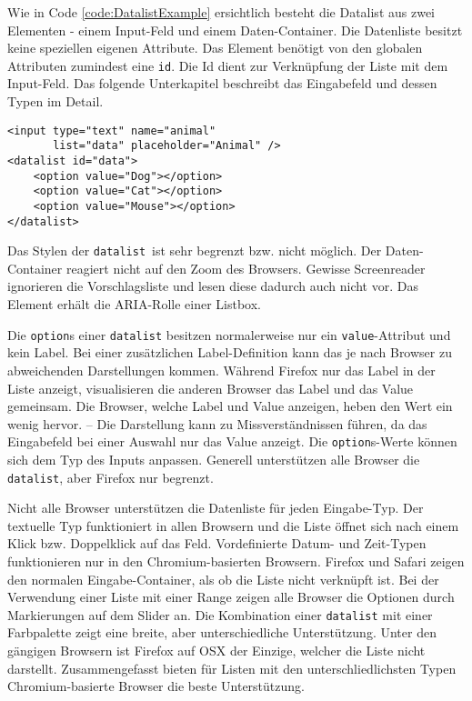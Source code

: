 Wie in Code \ref{code:DatalistExample} ersichtlich besteht die Datalist aus zwei Elementen - einem Input-Feld und einem Daten-Container. 
Die Datenliste besitzt keine speziellen eigenen Attribute.
Das Element benötigt von den globalen Attributen zumindest eine \texttt{id}.
Die Id dient zur Verknüpfung der Liste mit dem Input-Feld. 
Das folgende Unterkapitel \textbf{} beschreibt das Eingabefeld und dessen Typen im Detail.

\begin{lstlisting}[style = htmlcssjs, caption = Datalist Example, label = code:DatalistExample]
<input type="text" name="animal" 
       list="data" placeholder="Animal" />
<datalist id="data">
    <option value="Dog"></option>
    <option value="Cat"></option>
    <option value="Mouse"></option>
</datalist>
\end{lstlisting}

Das Stylen der \texttt{datalist}\footnotemark \ ist sehr begrenzt bzw. nicht möglich. 
Der Daten-Container reagiert nicht auf den Zoom des Browsers.
Gewisse Screenreader ignorieren die Vorschlagsliste und lesen diese dadurch auch nicht vor.
Das Element erhält die ARIA-Rolle einer Listbox.

Die \texttt{option}s einer \texttt{datalist} besitzen normalerweise nur ein \texttt{value}-Attribut und kein Label.
Bei einer zusätzlichen Label-Definition kann das je nach Browser zu abweichenden Darstellungen kommen. 
Während Firefox nur das Label in der Liste anzeigt, visualisieren die anderen Browser das Label und das Value gemeinsam.
Die Browser, welche Label und Value anzeigen, heben den Wert ein wenig hervor.
--
Die Darstellung kann zu Missverständnissen führen, da das Eingabefeld bei einer Auswahl nur das Value anzeigt. 
Die \texttt{option}s-Werte können sich dem Typ des Inputs anpassen. 
Generell unterstützen alle Browser die \texttt{datalist}, aber Firefox nur begrenzt.

Nicht alle Browser unterstützen die Datenliste für jeden Eingabe-Typ\footnotemark.
Der textuelle Typ funktioniert in allen Browsern und die Liste öffnet sich nach einem Klick bzw. Doppelklick auf das Feld.
Vordefinierte Datum- und Zeit-Typen funktionieren nur in den Chromium-basierten Browsern. 
Firefox und Safari zeigen den normalen Eingabe-Container, als ob die Liste nicht verknüpft ist.
Bei der Verwendung einer Liste mit einer Range zeigen alle Browser die Optionen durch Markierungen auf dem Slider an.
Die Kombination einer \texttt{datalist} mit einer Farbpalette zeigt eine breite, aber unterschiedliche Unterstützung. 
Unter den gängigen Browsern ist Firefox auf OSX der Einzige, welcher die Liste nicht darstellt.
Zusammengefasst bieten für Listen mit den unterschliedlichsten Typen Chromium-basierte Browser die beste Unterstützung.


